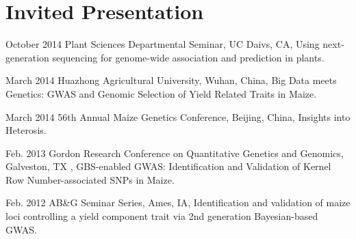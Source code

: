 \documentclass[letterpaper]{article}
\renewenvironment{itemize}{
  \begin{list}{}{
    \setlength{\leftmargin}{1.5em}
  }
}{
  \end{list}
}
\begin{document}
\section*{Invited Presentation}
\begin{itemize}
\item October 2014 Plant Sciences Departmental Seminar, UC Daivs, CA, Using next-generation sequencing for genome-wide association and prediction in plants.

\item March 2014 Huazhong Agricultural University, Wuhan, China, Big Data meets Genetics: GWAS and Genomic Selection of Yield Related Traits in Maize.
\item March 2014 56th Annual Maize Genetics Conference, Beijing, China, Insights into Heterosis.

\item Feb. 2013 Gordon Research Conference on Quantitative Genetics and Genomics, Galveston, TX , GBS-enabled GWAS: Identification and Validation of Kernel Row Number-associated SNPs in Maize.

\item Feb. 2012 AB\&G Seminar Series, Ames, IA, Identification and validation of maize loci controlling a yield component trait via 2nd generation Bayesian-based GWAS.
\end{itemize}

\end{document}
